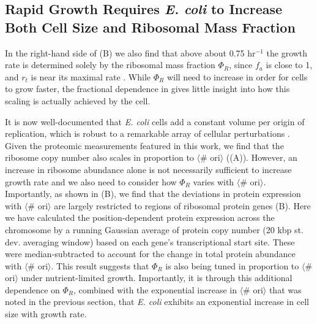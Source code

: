 \subsection{Rapid Growth Requires \textit{E. coli} to Increase Both Cell Size and Ribosomal
Mass Fraction}
In the right-hand side of (B) we also find that above about 0.75
hr$^{-1}$ the growth rate is determined solely by the ribosomal mass fraction
$\Phi_R$, since $f_a$ is close to 1, and $r_t$ is near its maximal rate
\citep{dai2016}. While $\Phi_R$ will need to increase in order for cells to
grow faster, the fractional dependence in 
gives little insight into how this scaling is actually achieved by the cell.

It is now well-documented that \textit{E. coli} cells add a constant volume per
origin of replication, which is robust to a remarkable array of cellular
perturbations \citep{si2017}. Given the proteomic measurements featured in this
work, we find that the ribosome copy number also scales in proportion to
$\langle$\# ori$\rangle$ ((A)). However,  an
increase in ribosome abundance alone is not necessarily sufficient to increase
growth rate and we also need to consider how $\Phi_R$ varies with $\langle$\#
ori$\rangle$. Importantly, as shown in (B), we find
that the deviations in protein expression with $\langle$\# ori$\rangle$ are
largely restricted to regions of ribosomal protein genes
(B). Here we have calculated the position-dependent
protein expression across the chromosome by a running Gaussian average of
protein copy number (20 kbp st. dev. averaging window) based on each gene's
transcriptional start site. These were median-subtracted to account for the
change in total protein abundance with $\langle$\# ori$\rangle$. This result
suggests that $\Phi_R$ is also being tuned in proportion to $\langle$\#
ori$\rangle$ under nutrient-limited growth. Importantly, it is through this
additional dependence on $\Phi_R$, combined with the exponential increase in
$\langle$\# ori$\rangle$ that was noted in the previous section, that \textit{E. coli}
exhibits an exponential increase in cell size with growth rate.


